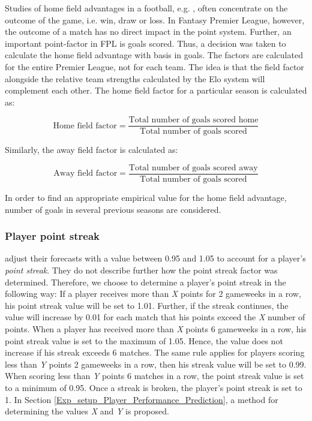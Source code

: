 \newpar

Studies of home field advantages in a football, e.g. \cite{Pollard}, often concentrate on the outcome of the game, i.e. win, draw or loss. In Fantasy Premier League, however, the outcome of a match has no direct impact in the point system. Further, an important point-factor in FPL is goals scored. Thus, a decision was taken to calculate the home field advantage with basis in goals. The factors are calculated for the entire Premier League, not for each team. The idea is that the field factor alongside the relative team strengths calculated by the Elo system will complement each other. The home field factor for a particular season is calculated as:

\begin{equation*}
    \textrm{Home field factor} = \frac{\textrm{Total number of goals scored home}}{\textrm{Total number of goals scored}} 
\end{equation*}

Similarly, the away field factor is calculated as:

\begin{equation*}
    \textrm{Away field factor} = \frac{\textrm{Total number of goals scored away}}{\textrm{Total number of goals scored}}
\end{equation*}

In order to find an appropriate empirical value for the home field advantage, number of goals in several previous seasons are considered.


\subsubsection{Player point streak}
\cite{Bonomo} adjust their forecasts with a value between 0.95 and 1.05 to account for a player's \textit{point streak}. They do not describe further how the point streak factor was determined. Therefore, we choose to determine a player's point streak in the following way: If a player receives more than \textit{X} points for 2 gameweeks in a row, his point streak value will be set to 1.01. Further, if the streak continues, the value will increase by 0.01 for each match that his points exceed the \textit{X} number of points. When a player has received more than \textit{X} points 6 gameweeks in a row, his point streak value is set to the maximum of 1.05. Hence, the value does not increase if his streak exceeds 6 matches. The same rule applies for players scoring less than \textit{Y} points 2 gameweeks in a row, then his streak value will be set to 0.99. When scoring less than \textit{Y} points 6 matches in a row, the point streak value is set to a minimum of 0.95. Once a streak is broken, the player's point streak is set to 1. In Section \ref{Exp_setup_Player_Performance_Prediction}, a method for determining the values \textit{X} and \textit{Y} is proposed.

